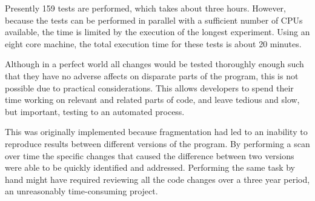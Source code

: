 Presently 159 tests are performed, which takes about three hours.
However, because the tests can be performed in parallel with a sufficient number of CPUs available, the time is limited by the execution of the longest experiment.
Using an eight core machine, the total execution time for these tests is about 20 minutes.

Although in a perfect world all changes would be tested thoroughly enough such that they have no adverse affects on disparate parts of the program, this is not possible due to practical considerations.
This allows developers to spend their time working on relevant and related parts of code, and leave tedious and slow, but important, testing to an automated process.

This was originally implemented because fragmentation had led to an inability to reproduce results between different versions of the program.
By performing a scan over time the specific changes that caused the difference between two versions were able to be quickly identified and addressed.
Performing the same task by hand might have required reviewing all the code changes over a three year period, an unreasonably time-consuming project.



